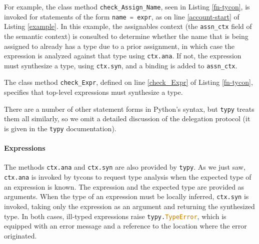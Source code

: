 \documentclass{sigplanconf}
\newcommand{\lip}[1]{\lstinline[language=Python,basicstyle=\ttfamily\small,deletendkeywords={tuple,buffer,map}]{#1}}
\begin{document}
For example, the class method \lip{check_Assign_Name}, seen in Listing \ref{fn-tycon}, is invoked for statements of the form \lip{name = expr}, as on line \ref{account-start} of Listing \ref{example}. In this example, the assignables context (the \lip{assn_ctx} field of the semantic context) is consulted to determine whether the name that is being assigned to already has a type due to a prior assignment, in which case the expression is analyzed against that type using \lip{ctx.ana}. If not, the expression must synthesize a type, using \lip{ctx.syn}, and a binding is added to \lip{assn_ctx}. %

The class method \lip{check_Expr}, defined on line \ref{check_Expr} of Listing \ref{fn-tycon}, specifies that top-level expressions must synthesize a type.

There are a number of other statement forms in Python's syntax, but \lip{typy} treats them all similarly, so we omit a detailed discussion of the delegation protocol (it is given in the \lip{typy} documentation).



\paragraph{Expressions} The methods \lip{ctx.ana} and \lip{ctx.syn} are also provided by \verb|typy|. As we just saw, \lip{ctx.ana} is invoked by tycons to request type analysis when the expected type of an expression is known. The expression and the expected type are provided as arguments. When the type of an expression must be locally inferred, \lip{ctx.syn} is invoked, taking only the expression as an argument and returning the synthesized type. In both cases, ill-typed expressions raise \lip{typy.TypeError}, which is equipped with an error message and a reference to the location where the error originated.  
\end{document}

